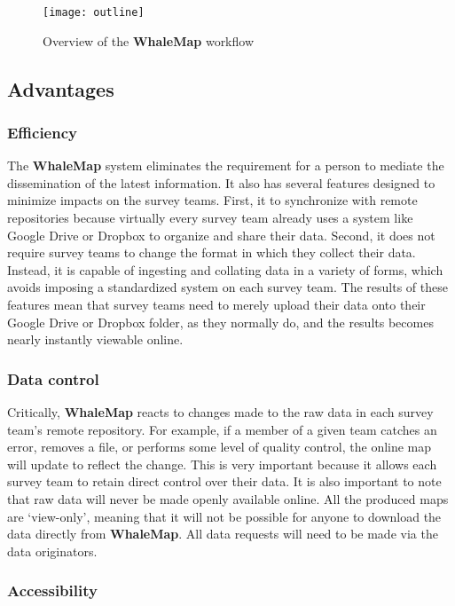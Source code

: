 \documentclass[11pt, letterpaper]{article}
\begin{document}
\begin{figure}[h]
	\centering
	\texttt{[image: outline]}
	\caption{Overview of the \textbf{WhaleMap} workflow}
	\label{fig:outline}
\end{figure}

\subsection{Advantages}

\subsubsection{Efficiency}

The \textbf{WhaleMap} system eliminates the requirement for a person to mediate the dissemination of the latest information. It also has several features designed to minimize impacts on the survey teams. First, it to synchronize with remote repositories because virtually every survey team already uses a system like Google Drive or Dropbox to organize and share their data. Second, it does not require survey teams to change the format in which they collect their data. Instead, it is capable of ingesting and collating data in a variety of forms, which avoids imposing a standardized system on each survey team. The results of these features mean that survey teams need to merely upload their data onto their Google Drive or Dropbox folder, as they normally do, and the results becomes nearly instantly viewable online.

\subsubsection{Data control}

Critically, \textbf{WhaleMap} reacts to changes made to the raw data in each survey team's remote repository. For example, if a member of a given team catches an error, removes a file, or performs some level of quality control, the online map will update to reflect the change. This is very important because it allows each survey team to retain direct control over their data. It is also important to note that raw data will never be made openly available online. All the produced maps are `view-only', meaning that it will not be possible for anyone to download the data directly from \textbf{WhaleMap}. All data requests will need to be made via the data originators.

\subsubsection{Accessibility}
\end{document}
